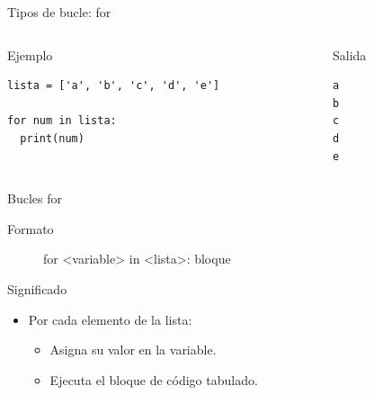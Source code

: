 \documentclass[bigger,unknownkeysallowed]{beamer}
\begin{document}
\begin{frame}[fragile,label={sec:org55bb2cc}]{Tipos de bucle: for}
 \begin{columns}
\begin{column}{0.5\columnwidth}
\begin{exampleblock}{Ejemplo}
\begin{verbatim}
lista = ['a', 'b', 'c', 'd', 'e']

for num in lista:
  print(num)
\end{verbatim}
\end{exampleblock}
\end{column}
\begin{column}{0.5\columnwidth}
\begin{block}{Salida}
\scriptsize
\begin{verbatim}
a
b
c
d
e
\end{verbatim}
\end{block}
\end{column}
\end{columns}


\begin{block}{Bucles for}
\begin{description}
\item[{Formato}] for <variable> in <lista>:
bloque
\end{description}
\end{block}

\begin{block}{Significado}
\begin{itemize}
\item Por cada elemento de la lista:
\begin{itemize}
\item Asigna su valor en la variable.
\item Ejecuta el bloque de código tabulado.
\end{itemize}
\end{itemize}
\end{block}
\end{frame}
\end{document}
